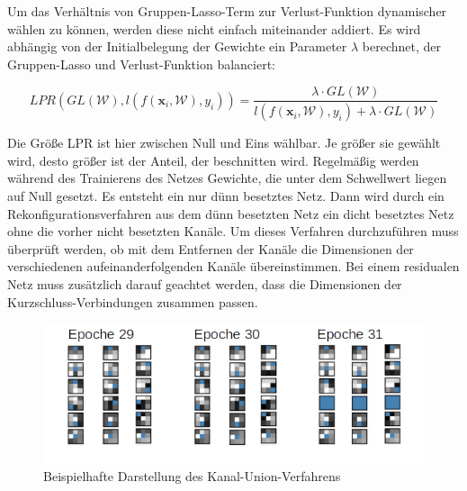 Um das Verhältnis von Gruppen-Lasso-Term zur Verlust-Funktion dynamischer wählen zu können, werden diese nicht einfach miteinander addiert. Es wird abhängig von der Initialbelegung der Gewichte ein Parameter $\lambda$  berechnet, der Gruppen-Lasso und Verlust-Funktion balanciert:

\begin{equation}
 LPR\left(GL(\mathcal{W}),l(f(\mathbf{x}_i,\mathcal{W}),y_i)\right) = \frac{\lambda \cdot GL(\mathcal{W})}{l(f(\mathbf{x}_i,\mathcal{W}), y_i) + \lambda \cdot GL(\mathcal{W})}           
\end{equation}

Die Größe LPR ist hier zwischen Null und Eins wählbar. Je größer sie gewählt wird, desto größer ist der Anteil, der beschnitten wird. Regelmäßig werden während des Trainierens des Netzes Gewichte, die unter dem Schwellwert liegen auf Null gesetzt. Es entsteht ein nur dünn besetztes Netz. Dann wird durch ein Rekonfigurationsverfahren aus dem dünn besetzten Netz ein dicht besetztes Netz ohne die vorher nicht besetzten Kanäle. Um dieses Verfahren durchzuführen muss überprüft werden, ob mit dem Entfernen der Kanäle die Dimensionen der verschiedenen aufeinanderfolgenden Kanäle übereinstimmen. Bei einem residualen Netz muss zusätzlich darauf geachtet werden, dass die Dimensionen der Kurzschluss-Verbindungen zusammen passen.

\begin{figure}[h]
 \centering
 \includegraphics[width=0.9 \textwidth]{KapitelPartA/images/union.png}
 \caption{Beispielhafte Darstellung des Kanal-Union-Verfahrens}
 \label{abb:union}
\end{figure}



